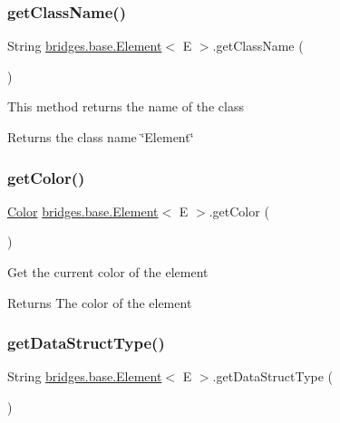 \subsubsection{\texorpdfstring{getClassName()}{getClassName()}}
{\footnotesize\ttfamily String \mbox{\hyperlink{classbridges_1_1base_1_1_element}{bridges.\+base.\+Element}}$<$ E $>$.get\+Class\+Name (\begin{DoxyParamCaption}{ }\end{DoxyParamCaption})}

This method returns the name of the class \begin{DoxyReturn}{Returns}
the class name \char`\"{}\+Element\char`\"{} 
\end{DoxyReturn}
\mbox{\label{classbridges_1_1base_1_1_element_a6b80259f4f23b30df5486bf70f17c3b8}} 
\subsubsection{\texorpdfstring{getColor()}{getColor()}}
{\footnotesize\ttfamily \mbox{\hyperlink{classbridges_1_1base_1_1_color}{Color}} \mbox{\hyperlink{classbridges_1_1base_1_1_element}{bridges.\+base.\+Element}}$<$ E $>$.get\+Color (\begin{DoxyParamCaption}{ }\end{DoxyParamCaption})}

Get the current color of the element \begin{DoxyReturn}{Returns}
The color of the element 
\end{DoxyReturn}
\mbox{\label{classbridges_1_1base_1_1_element_a6a1b70fa4b1936d10c6deb433acf8cd9}} 
\subsubsection{\texorpdfstring{getDataStructType()}{getDataStructType()}}
{\footnotesize\ttfamily String \mbox{\hyperlink{classbridges_1_1base_1_1_element}{bridges.\+base.\+Element}}$<$ E $>$.get\+Data\+Struct\+Type (\begin{DoxyParamCaption}{ }\end{DoxyParamCaption})}



